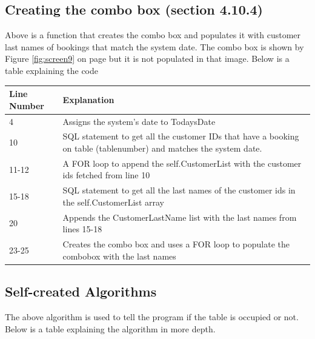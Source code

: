 {\begin{center}
\begin{tabular}{|p{5cm}|p{7.5cm}|}
\end{tabular}
\end{center}
\newpage
\subsection{Creating the combo box (section 4.10.4)}

Above is a function that creates the combo box and populates it with customer last names of bookings that match the system date. The combo box is shown by Figure \ref{fig:screen9} on page \pageref{fig:screen9} but it is not populated in that image. Below is a table explaining the code

\begin{center}
\begin{tabular}{|p{5cm}|p{7.5cm}|}
\hline
\textbf{Line Number} & \textbf{Explanation} \\ \hline
4 & Assigns the system's date to TodaysDate \\ \hline
10 & SQL statement to get all the customer IDs that have a booking on table (tablenumber) and matches the system date.  \\ \hline
11-12 & A FOR loop to append the self.CustomerList with the customer ids fetched from line 10 \\ \hline
15-18 & SQL statement to get all the last names of the customer ids in the self.CustomerList array \\ \hline
20 & Appends the CustomerLastName list with the last names from lines 15-18 \\ \hline
23-25 & Creates the combo box and uses a FOR loop to populate the combobox with the last names \\ \hline


\end{tabular}
\end{center}

\newpage
\subsection{Self-created Algorithms}
The above algorithm is used to tell the program if the table is occupied or not. Below is a table explaining the algorithm in more depth.

}
